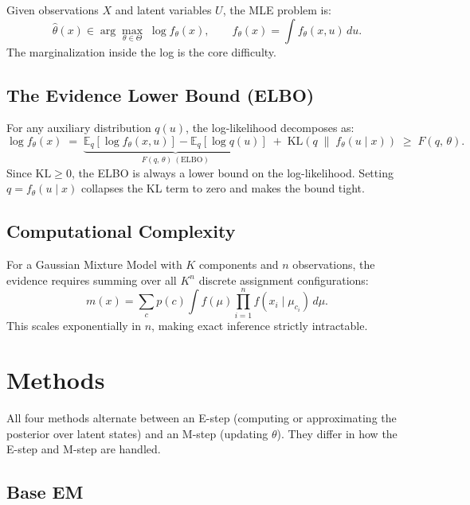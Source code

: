 \documentclass{article}
\newcommand{\E}{\mathbb{E}}
\newcommand{\KL}{\mathrm{KL}}
\begin{document}
Given observations $X$ and latent variables $U$, the MLE problem is:
\begin{equation}
  \hat\theta(x) \in \arg\max_{\theta \in \Theta}\; \log f_\theta(x),
  \qquad f_\theta(x) = \int f_\theta(x, u)\, du.
\end{equation}
The marginalization inside the log is the core difficulty.

\subsection{The Evidence Lower Bound (ELBO)}

For any auxiliary distribution $q(u)$, the log-likelihood decomposes as:
\begin{equation}
  \log f_\theta(x)
  \;=\;
  \underbrace{
    \E_q\!\left[\log f_\theta(x, u)\right] - \E_q\!\left[\log q(u)\right]
  }_{\displaystyle F(q,\, \theta)\ (\text{ELBO})}
  \;+\;
  \KL\!\left(q \;\|\; f_\theta(u \mid x)\right)
  \;\geq\; F(q,\, \theta).
  \label{eq:elbo}
\end{equation}
Since $\KL \geq 0$, the ELBO is always a lower bound on the log-likelihood.
Setting $q = f_\theta(u \mid x)$ collapses the KL term to zero and makes the
bound tight.

\subsection{Computational Complexity}

For a Gaussian Mixture Model with $K$ components and $n$ observations, the
evidence requires summing over all $K^n$ discrete assignment configurations:
\begin{equation}
  m(x) = \sum_c p(c) \int f(\mu) \prod_{i=1}^n f(x_i \mid \mu_{c_i})\, d\mu.
\end{equation}
This scales exponentially in $n$, making exact inference strictly intractable.


\section{Methods}

All four methods alternate between an E-step (computing or approximating
the posterior over latent states) and an M-step (updating $\theta$). They
differ in how the E-step and M-step are handled.

\subsection{Base EM}
\end{document}
